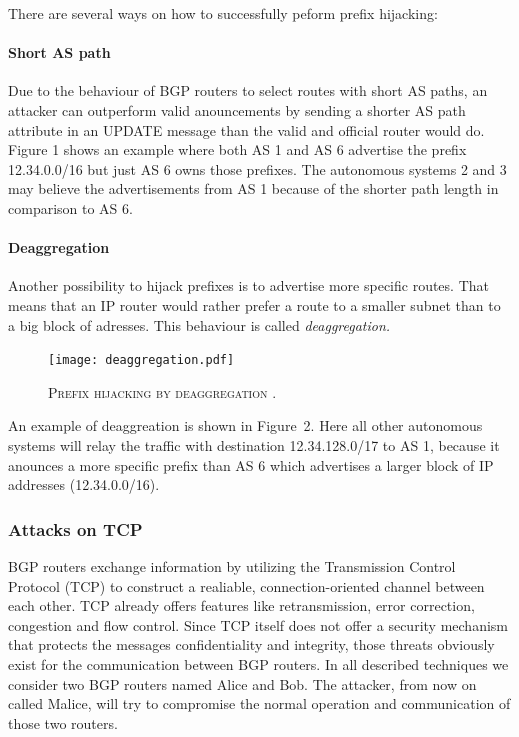\documentclass[12pt,a4paper]{IEEEtran}
\begin{document}
		There are several ways on how to successfully peform prefix hijacking:
		\paragraph{Short AS path}
		Due to the behaviour of BGP routers to select routes with short AS paths, an attacker can outperform valid anouncements by sending a shorter AS path attribute in an UPDATE message than the valid and official router would do. 
		Figure 1 shows an example where both AS 1 and AS 6 advertise the prefix 12.34.0.0/16 but just AS 6 owns those prefixes. The autonomous systems 2 and 3 may believe the advertisements from AS 1 because of the shorter path length in comparison to AS 6.

		\paragraph{Deaggregation}
		Another possibility to hijack prefixes is to advertise more specific routes. That means that an IP router would rather prefer a route to a smaller subnet than to a big block of adresses. This behaviour is called \emph{deaggregation.} 
		
		\begin{figure}[ht!]
			\begin{center}
				\texttt{[image: deaggregation.pdf]}
				\caption{\textsc{Prefix hijacking by deaggregation \citep{Butler2010}.}}
			\end{center}
			\label{deaggregation}
		\end{figure}
		An example of deaggreation is shown in \mbox{Figure 2}. Here all other autonomous systems will relay the traffic with destination 12.34.128.0/17 to AS 1, because it anounces a more specific prefix than AS 6 which advertises a larger block of IP addresses (12.34.0.0/16).
		
	       	\subsubsection{Attacks on TCP}
		BGP routers exchange information by utilizing the Transmission Control Protocol \citep{Postel1981c} (TCP) to construct a realiable, connection-oriented channel between each other. 
		TCP already offers features like retransmission, error correction, congestion and flow control. 
		Since TCP itself does not offer a security mechanism that protects the messages confidentiality and integrity, those threats obviously exist for the communication between BGP routers. 
		In all described techniques we consider two BGP routers named Alice and Bob. The attacker, from now on called Malice, will try to compromise the normal operation and communication of those two routers.
\end{document}
